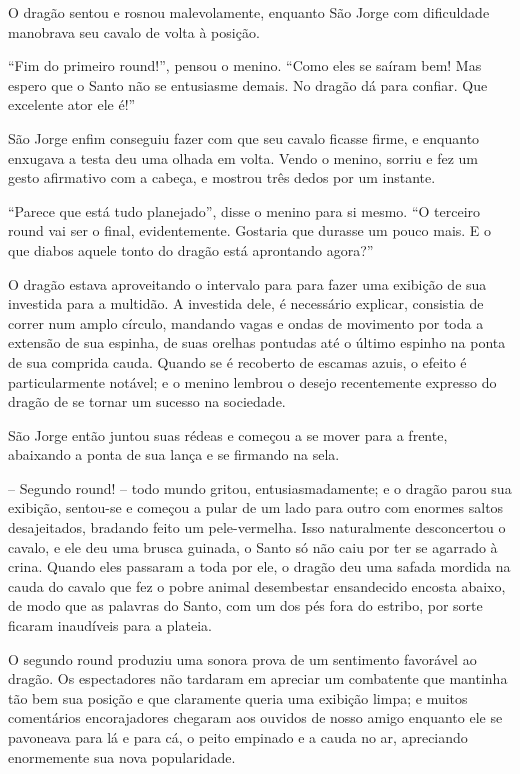 O dragão sentou e rosnou malevolamente, enquanto São Jorge com
dificuldade manobrava seu cavalo de volta à posição.

“Fim do primeiro round!”, pensou o menino. “Como eles se saíram bem!
Mas espero que o Santo não se entusiasme demais. No dragão dá para
confiar. Que excelente ator ele é!”

São Jorge enfim conseguiu fazer com que seu cavalo ficasse firme, e
enquanto enxugava a testa deu uma olhada em volta. Vendo o menino,
sorriu e fez um gesto afirmativo com a cabeça, e mostrou três dedos
por um instante.

“Parece que está tudo planejado”, disse o menino para si mesmo. “O
terceiro round vai ser o final, evidentemente. Gostaria que durasse
um pouco mais. E o que diabos aquele tonto do dragão está aprontando
agora?”

O dragão estava aproveitando o intervalo para para fazer uma exibição
de sua investida para a multidão. A investida dele, é necessário
explicar, consistia de correr num amplo círculo, mandando vagas e
ondas de movimento por toda a extensão de sua espinha, de suas
orelhas pontudas até o último espinho na ponta de sua comprida cauda.
Quando se é recoberto de escamas azuis, o efeito é particularmente
notável; e o menino lembrou o desejo recentemente expresso do dragão
de se tornar um sucesso na sociedade. 

São Jorge então juntou suas rédeas e começou a se mover para a frente,
abaixando a ponta de sua lança e se firmando na sela.

-- Segundo round! -- todo mundo gritou, entusiasmadamente; e o dragão
parou sua exibição, sentou-se e começou a pular de um lado para outro
com enormes saltos desajeitados, bradando feito um pele-vermelha.
Isso naturalmente desconcertou o cavalo, e ele deu uma brusca
guinada, o Santo só não caiu por ter se agarrado à crina. Quando eles
passaram a toda por ele, o dragão deu uma safada mordida na cauda do
cavalo que fez o pobre animal desembestar ensandecido encosta abaixo,
de modo que as palavras do Santo, com um dos pés fora do estribo, por
sorte ficaram inaudíveis para a plateia.

O segundo round produziu uma sonora prova de um sentimento favorável
ao dragão. Os espectadores não tardaram em apreciar um combatente que
mantinha tão bem sua posição e que claramente queria uma exibição
limpa; e muitos comentários encorajadores chegaram aos ouvidos de
nosso amigo enquanto ele se pavoneava para lá e para cá, o peito
empinado e a cauda no ar, apreciando enormemente sua nova
popularidade.

